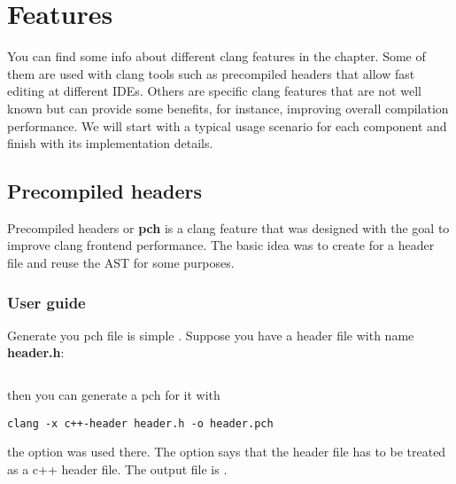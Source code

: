 \chapter{Features}
\pagestyle{fancy}
\fancyhf{}
\rhead{\thepage}

 You can find some info about different clang features in the chapter. Some of
 them are used with clang tools such as precompiled headers that allow fast
 editing at different IDEs. Others are specific clang features that are not well
 known but can provide some benefits, for instance, improving overall
 compilation performance. We will start with a typical usage scenario for each
 component and finish with its implementation details.
 
\section{Precompiled headers}
Precompiled headers or \textbf{pch} is a clang feature that was
designed with the goal to improve clang frontend performance. The
basic idea was to create  for a header file and reuse the AST for
some purposes.

\subsection{User guide}
Generate you pch file is simple \citep{clang:user_manual}. Suppose you have a header file with
name \textbf{header.h}:
\inputminted{c++}{./src/pch/simple/header.h} then you can generate a pch for it with
\begin{verbatim}
clang -x c++-header header.h -o header.pch
\end{verbatim}
the option  was used there. The option says that
the header file has to be treated as a c++ header file. The output
file is .

